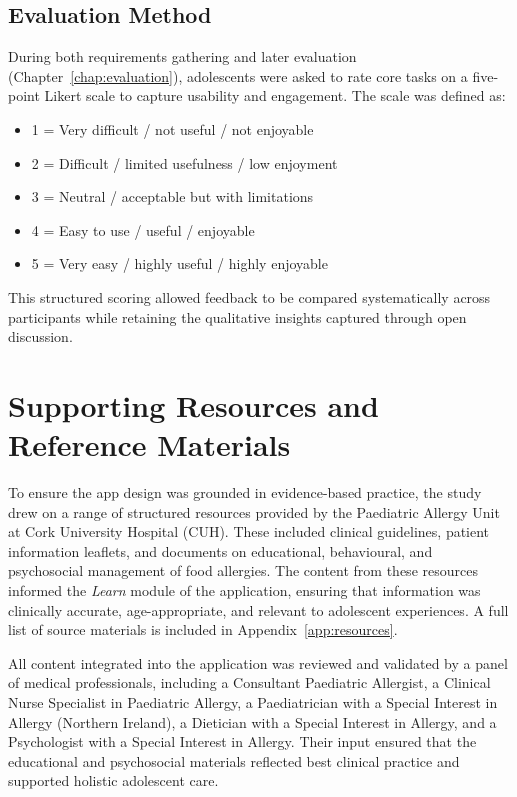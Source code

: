 \documentclass[MScCS]{uccthesis}
\begin{document}
\subsection*{Evaluation Method}
During both requirements gathering and later evaluation (Chapter~\ref{chap:evaluation}), adolescents were asked to rate core tasks on a five-point Likert scale to capture usability and engagement. The scale was defined as: 
\begin{itemize}
    \item 1 = Very difficult / not useful / not enjoyable 
    \item 2 = Difficult / limited usefulness / low enjoyment
    \item 3 = Neutral / acceptable but with limitations
    \item 4 = Easy to use / useful / enjoyable 
    \item 5 = Very easy / highly useful / highly enjoyable
\end{itemize}
This structured scoring allowed feedback to be compared systematically across participants while retaining the qualitative insights captured through open discussion.



\section{Supporting Resources and Reference Materials}
To ensure the app design was grounded in evidence-based practice, the study drew on a range of structured resources provided by the Paediatric Allergy Unit at Cork University Hospital (CUH). These included clinical guidelines, patient information leaflets, and documents on educational, behavioural, and psychosocial management of food allergies. The content from these resources informed the \textit{Learn} module of the application, ensuring that information was clinically accurate, age-appropriate, and relevant to adolescent experiences. A full list of source materials is included in Appendix~\ref{app:resources}.  

All content integrated into the application was reviewed and validated by a panel of medical professionals, including a Consultant Paediatric Allergist, a Clinical Nurse Specialist in Paediatric Allergy, a Paediatrician with a Special Interest in Allergy (Northern Ireland), a Dietician with a Special Interest in Allergy, and a Psychologist with a Special Interest in Allergy. Their input ensured that the educational and psychosocial materials reflected best clinical practice and supported holistic adolescent care.  
\end{document}
